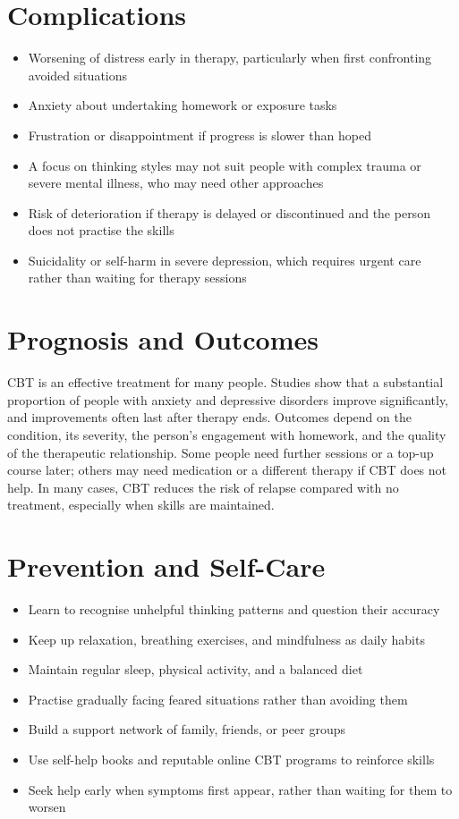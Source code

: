 \section*{Complications}
\begin{itemize}
    \item Worsening of distress early in therapy, particularly when first confronting avoided situations
    \item Anxiety about undertaking homework or exposure tasks
    \item Frustration or disappointment if progress is slower than hoped
    \item A focus on thinking styles may not suit people with complex trauma or severe mental illness, who may need other approaches
    \item Risk of deterioration if therapy is delayed or discontinued and the person does not practise the skills
    \item Suicidality or self-harm in severe depression, which requires urgent care rather than waiting for therapy sessions
\end{itemize}

\section*{Prognosis and Outcomes}
CBT is an effective treatment for many people. Studies show that a substantial proportion of people with anxiety and depressive disorders improve significantly, and improvements often last after therapy ends. Outcomes depend on the condition, its severity, the person's engagement with homework, and the quality of the therapeutic relationship. Some people need further sessions or a top-up course later; others may need medication or a different therapy if CBT does not help. In many cases, CBT reduces the risk of relapse compared with no treatment, especially when skills are maintained.

\section*{Prevention and Self-Care}
\begin{itemize}
    \item Learn to recognise unhelpful thinking patterns and question their accuracy
    \item Keep up relaxation, breathing exercises, and mindfulness as daily habits
    \item Maintain regular sleep, physical activity, and a balanced diet
    \item Practise gradually facing feared situations rather than avoiding them
    \item Build a support network of family, friends, or peer groups
    \item Use self-help books and reputable online CBT programs to reinforce skills
    \item Seek help early when symptoms first appear, rather than waiting for them to worsen
\end{itemize}
